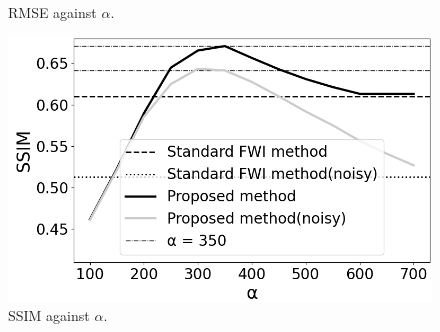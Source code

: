 \begin{figure}[htbp]
\begin{minipage}{58mm}
        \caption{RMSE against $\alpha$.}
        \label{fig:alpha-rmse}
        \vspace{-5mm}
    \end{minipage}
    \hspace{-2mm}
    \begin{minipage}{58mm}
        \centering
        \includegraphics[width=\linewidth]{public/alpha-ssim-edited}
        \caption{SSIM against $\alpha$.}
        \label{fig:alpha-ssim}
        \vspace{-5mm}
    \end{minipage}
\end{figure}
